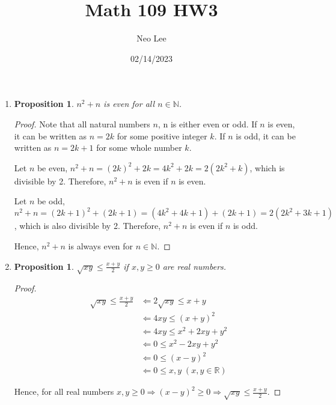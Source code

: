 \documentclass{article}
\title{Math 109 HW3}
\author{Neo Lee}
\date{02/14/2023}
\newtheorem{prop}[thm]{Proposition}
\begin{document}
 

\maketitle 

\begin{enumerate}[label={(\arabic*)}]
\item 
\begin{prop}
    $n^2 + n$ is even for all $n \in \mathbb{N}$.
\end{prop}
\begin{proof}
    Note that all natural numbers $n$, n is either even or odd.
    If $n$ is even, it can be written as $n = 2k$ for some positive integer $k$.
    If $n$ is odd, it can be written as $n = 2k + 1$ for some whole number $k$.

    Let $n$ be even, $n^2 + n = (2k)^2 + 2k = 4k^2 + 2k = 2(2k^2 + k)$, which is divisible by 2.
    Therefore, $n^2 + n$ is even if $n$ is even.

    Let $n$ be odd, $n^2 + n = (2k + 1)^2 + (2k + 1) = (4k^2 + 4k + 1) + (2k + 1) = 2(2k^2 + 3k + 1)$, which is also divisible by 2.
    Therefore, $n^2 + n$ is even if $n$ is odd.

    Hence, $n^2 + n$ is always even for $n \in \mathbb{N}$.
\end{proof}

\item 
\begin{prop}
    $\sqrt{xy} \le \frac{x + y}{2}$ if $x, y \ge 0$ are real numbers.
\end{prop}
\begin{proof}
    \begin{align}
        \sqrt{xy} \le \frac{x + y}{2} & \Leftarrow 2\sqrt{xy} \le x + y \\
        & \Leftarrow 4xy \le (x + y)^2 \\
        & \Leftarrow 4xy \le x^2 + 2xy + y^2 \\
        & \Leftarrow 0 \le x^2 - 2xy + y^2 \\ 
        & \Leftarrow 0 \le (x - y)^2 \\ 
        & \Leftarrow 0 \le x, y \; (x, y \in \mathbb{R})
    \end{align}
    
    Hence, for all real numbers $x, y \ge 0 \Rightarrow (x - y)^2 \ge 0 \Rightarrow \sqrt{xy} \le \frac{x + y}{2}$.
\end{proof}


\end{enumerate}
\end{document}
